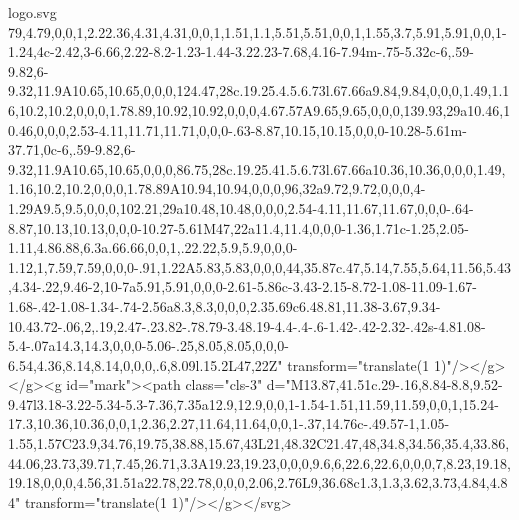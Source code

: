 \begin{filecontents*}[overwrite]{logo.svg}
79,4.79,0,0,1,2.22.36,4.31,4.31,0,0,1,1.51,1.1,5.51,5.51,0,0,1,1.55,3.7,5.91,5.91,0,0,1-1.24,4c-2.42,3-6.66,2.22-8.2-1.23-1.44-3.22.23-7.68,4.16-7.94m-.75-5.32c-6,.59-9.82,6-9.32,11.9A10.65,10.65,0,0,0,124.47,28c.19.25.4.5.6.73l.67.66a9.84,9.84,0,0,0,1.49,1.16,10.2,10.2,0,0,0,1.78.89,10.92,10.92,0,0,0,4.67.57A9.65,9.65,0,0,0,139.93,29a10.46,10.46,0,0,0,2.53-4.11,11.71,11.71,0,0,0-.63-8.87,10.15,10.15,0,0,0-10.28-5.61m-37.71,0c-6,.59-9.82,6-9.32,11.9A10.65,10.65,0,0,0,86.75,28c.19.25.41.5.6.73l.67.66a10.36,10.36,0,0,0,1.49,1.16,10.2,10.2,0,0,0,1.78.89A10.94,10.94,0,0,0,96,32a9.72,9.72,0,0,0,4-1.29A9.5,9.5,0,0,0,102.21,29a10.48,10.48,0,0,0,2.54-4.11,11.67,11.67,0,0,0-.64-8.87,10.13,10.13,0,0,0-10.27-5.61M47,22a11.4,11.4,0,0,0-1.36,1.71c-1.25,2.05-1.11,4.86.88,6.3a.66.66,0,0,1,.22.22,5.9,5.9,0,0,0-1.12,1,7.59,7.59,0,0,0-.91,1.22A5.83,5.83,0,0,0,44,35.87c.47,5.14,7.55,5.64,11.56,5.43,4.34-.22,9.46-2,10-7a5.91,5.91,0,0,0-2.61-5.86c-3.43-2.15-8.72-1.08-11.09-1.67-1.68-.42-1.08-1.34-.74-2.56a8.3,8.3,0,0,0,2.35.69c6.48.81,11.38-3.67,9.34-10.43.72-.06,2,.19,2.47-.23.82-.78.79-3.48.19-4.4-.4-.6-1.42-.42-2.32-.42s-4.81.08-5.4-.07a14.3,14.3,0,0,0-5.06-.25,8.05,8.05,0,0,0-6.54,4.36,8.14,8.14,0,0,0,.6,8.09l.15.2L47,22Z" transform="translate(1 1)"/></g></g><g id="mark"><path class="cls-3" d="M13.87,41.51c.29-.16,8.84-8.8,9.52-9.47l3.18-3.22-5.34-5.3-7.36,7.35a12.9,12.9,0,0,1-1.54-1.51,11.59,11.59,0,0,1,15.24-17.3,10.36,10.36,0,0,1,2.36,2.27,11.64,11.64,0,0,1-.37,14.76c-.49.57-1,1.05-1.55,1.57C23.9,34.76,19.75,38.88,15.67,43L21,48.32C21.47,48,34.8,34.56,35.4,33.86,44.06,23.73,39.71,7.45,26.71,3.3A19.23,19.23,0,0,0,9.6,6,22.6,22.6,0,0,0,7,8.23,19.18,19.18,0,0,0,4.56,31.51a22.78,22.78,0,0,0,2.06,2.76L9,36.68c1.3,1.3,3.62,3.73,4.84,4.84" transform="translate(1 1)"/></g></svg>
	\end{filecontents*}
\else

